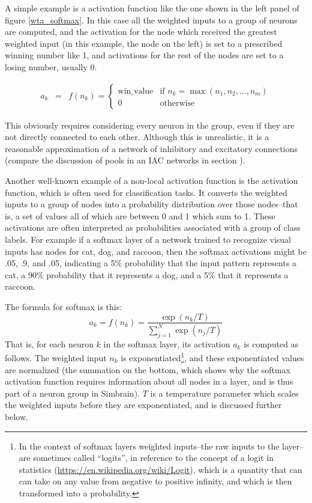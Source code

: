 A simple example is a  activation function like the one shown in the left panel of figure \ref{wta_softmax}. In this case all the weighted inputs to a group of neurons are computed, and the activation for the node which received the greatest weighted input (in this example, the node on the left) is set to a prescribed winning number like 1, and activations for the rest of the nodes are set to a losing number, usually 0. 

\begin{eqnarray*}
a_k &=& f(n_k) = 
\begin{cases} 
    \text{win\_value} & \text{if } n_k = \max(n_1, n_2, \dots, n_m) \\
    0 & \text{otherwise} 
\end{cases}
\end{eqnarray*}

This obviously requires considering every neuron in the group, even if they are not directly connected to each other.  Although this is unrealistic, it is a reasonable approximation of a network of inhibitory and excitatory connections  (compare the discussion of pools in an IAC networks in section ).

Another well-known example of a non-local activation function is the  activation function, which is often used for classification tasks. It converts the weighted inputs to a group of nodes into a probability distribution over those nodes--that is, a set of values all of which are between 0 and 1 which sum to 1.   These activations are often interpreted as probabilities associated with a group of class labels. For example if a softmax layer of a network trained to recognize visual inputs has nodes for cat, dog, and raccoon, then the softmax activations might be .05, .9, and .05, indicating a 5\% probability that the input pattern represents a cat, a 90\% probability that it represents a dog, and a 5\% that it represents a raccoon.

The formula for softmax is this:
\begin{equation*}
a_k = f(n_k)
   = \frac{\exp\left(n_k/T\right)}
          {\displaystyle{\sum_{j=1}^N}\exp\left(n_j/T\right)}
\end{equation*}
That is, for each neuron $k$ in the softmax layer, its activation $a_k$ is computed as follows. The weighted input $n_k$ is exponentiated\footnote{In the context of softmax layers weighted inputs--the raw inputs to the layer--are sometimes called ``logits'', in reference to the concept of a logit in statistics (\url{https://en.wikipedia.org/wiki/Logit}), which is a quantity that can can take on any value from negative to positive infinity, and which is then transformed into a probability.}, and these exponentiated values are normalized (the summation on the bottom, which shows why the softmax activation function requires information about all nodes in a layer, and is thus part of a neuron group in Simbrain). $T$ is a temperature parameter which scales the weighted inputs before they are exponentiated, and is discussed further below. 

